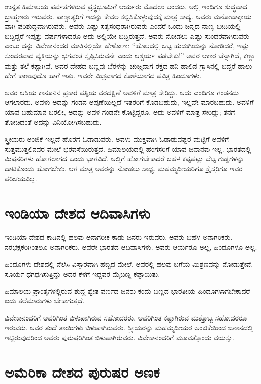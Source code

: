 ಉನ್ನತ ಹಿಮಾಲಯ ಪರ್ವತಗಳಿರುವ ಪ್ರಸ್ಥಭೂಮಿಗೆ ಆರ್ಯರು ಮೊದಲು ಬಂದರು. ಅಲ್ಲಿ ಇಂದಿಗೂ ಶುದ್ಧವಾದ ಬ್ರಾಹ್ಮಣರು ಇರುವರು. ಪಾಶ್ಚಾತ್ಯರಿಗೆ ಇದನ್ನು ಕೇವಲ ಕಲ್ಪಿಸಿಕೊಳ್ಳುವುದಕ್ಕೆ ಮಾತ್ರ ಸಾಧ್ಯ. ಅವರು ಮನೋವಾಕ್ಕಾಯ ವಾಗಿ ಪರಿಶುದ್ಧವಾಗಿರುವರು. ಅವರು ಎಷ್ಟು ಸತ್ಯಸಂಧರಾಗಿರುವರು ಎಂದರೆ ಒಂದು ಚಿನ್ನದ ನಾಣ್ಯ ಬೀದಿಯಲ್ಲಿ ಬಿದ್ದಿದ್ದರೆ ಇಪ್ಪತ್ತು ವರ್ಷಗಳಾದರೂ ಅದು ಅಲ್ಲಿಯೇ ಬಿದ್ದಿರುತ್ತದೆ. ಅವರು ನೋಡಲು ಎಷ್ಟು ಸುಂದರವಾಗಿರುವರು ಎಂಬು ದನ್ನು ವಿವೇಕಾನಂದರ ಮಾತಿನಲ್ಲಿಯೇ ಹೇಳೋಣ: “ಹೊಲದಲ್ಲಿ ಒಬ್ಬ ಹುಡುಗಿಯನ್ನು ನೋಡಿದರೆ, ಇಷ್ಟು ಸುಂದರವಾದ ವ್ಯಕ್ತಿಯನ್ನು ಭಗವಂತ ಸೃಷ್ಟಿಸಿರುವನೇ ಎಂದು ಆಶ್ಚರ್ಯ ಪಡಬೇಕು!” ಅವರ ಆಕಾರ ಚೆನ್ನಾಗಿದೆ, ಕಣ್ಣು ಮತ್ತು ತಲೆ ಕಪ್ಪಾಗಿವೆ. ಅವರ ದೇಹದ ಬಣ್ಣವು ಬೆರಳನ್ನು ಚುಚ್ಚಿದಾಗ ರಕ್ತದ ಹನಿ ಹಾಲಿನ ಗ್ಲಾಸಿನಲ್ಲಿ ಬಿದ್ದರೆ ಹಾಲು ಹೇಗೆ ಕಾಣುವುದೊ ಹಾಗೆ ಇತ್ತು. ಇವರೇ ಮಿಶ್ರವಾಗದ ಕೊಳೆಯಾಗದ ಪವಿತ್ರ ಹಿಂದೂಗಳು.

ಅವರ ಆಸ್ತಿಯ ಕಾನೂನಿನ ಪ್ರಕಾರ ಪತ್ನಿಯ ವರದಕ್ಷಿಣೆ ಅವಳಿಗೆ ಮಾತ್ರ ಸೇರಿದ್ದು. ಅದು ಎಂದಿಗೂ ಗಂಡನದು ಆಗಲಾರದು. ಅವಳು ಅದನ್ನು ಗಂಡನ ಅಪ್ಪಣೆಯಿಲ್ಲದೆ ಇತರರಿಗೆ ಕೊಡಬಹುದು, ಇಲ್ಲವೇ ಮಾರಬಹುದು. ಅವಳಿಗೆ ಯಾವ ಬಹುಮಾನ ಬರಲೀ, ಅದನ್ನು ಅವಳ ಗಂಡನೇ ಕೊಟ್ಟಿದ್ದರೂ, ಅದು ಅವಳಿಗೆ ಮಾತ್ರ ಸೇರಿದ್ದು; ತನಗೆ ತೋಚಿದಂತೆ ಅದನ್ನು ವಿನಿಯೋಗಿಸಬಹುದು.

ಸ್ತ್ರೀಯರು ಅಂಜಿಕೆ ಇಲ್ಲದೆ ಹೊರಗೆ ಓಡಾಡುವರು. ಅವಳು ಮುಕ್ತವಾಗಿ ಓಡಾಡುವಷ್ಟರ ಮಟ್ಟಿಗೆ ಅವಳಿಗೆ ಸುತ್ತಮುತ್ತಲಿನವರ ಮೇಲೆ ಭರವಸೆಯಿರುತ್ತದೆ. ಹಿಮಾಲಯದಲ್ಲಿ ಹೆಂಗಸರಿಗೆ ಯಾವ ಜನಾನವು ಇಲ್ಲ. ಭಾರತದಲ್ಲಿ ಮಿಷನರಿಗಳು ಹೋಗಲಾಗದ ಒಂದು ಭಾಗವಿದೆ. ಅಲ್ಲಿಗೆ ಹೋಗಬೇಕಾದರೆ ಬಹಳ ಕಷ್ಟಪಟ್ಟು ಬೆಟ್ಟ ಗುಡ್ಡಗಳನ್ನು ದಾಟಿಕೊಂಡು ಹೋಗಬೇಕು. ಆಗ ಮಾತ್ರ ಅವರನ್ನು ನೋಡಲು ಸಾಧ್ಯ. ಮಹಮ್ಮದೀಯರಿಗೂ ಕ್ರೈಸ್ತರಿಗೂ ಇವರ ಪರಿಚಯವಿಲ್ಲ.

\delimiter


\section{ಇಂಡಿಯಾ ದೇಶದ ಆದಿವಾಸಿಗಳು}

ಇಂಡಿಯಾ ದೇಶದ ಕಾಡಿನಲ್ಲಿ ಹಲವು ಅನಾಗರೀಕ ಕಾಡು ಜನರು ಇರುವರು. ಅವರು ಬಹಳ ಅನಾಗರಿಕರು. ನರಭಕ್ಷಕರಿಗಿಂತಲೂ ಅನಾಗರಿಕರು. ಅವರೇ ಭಾರತದ ಆದಿವಾಸಿಗಳು. ಅವರು ಆರ್ಯರೂ ಅಲ್ಲ, ಹಿಂದೂಗಳೂ ಅಲ್ಲ.

ಹಿಂದೂಗಳು ದೇಶದಲ್ಲಿ ನೆಲೆಸಿ ವಿಸ್ತಾರವಾಗಿ ಹಬ್ಬಿದ ಮೇಲೆ, ಅವರಲ್ಲಿ ಹಲವು ಬಗೆಯ ಮಿಶ್ರಣವನ್ನು ನೋಡುತ್ತೇವೆ. ಸೂರ್ಯ ಧಗಧಗಿಸುತ್ತಿದ್ದು ಅದರ ಕೆಳಗೆ ಇದ್ದವರ ಮೈಬಣ್ಣ ಕಪ್ಪಾಯಿತು.

ಹಿಮಾಲಯ ಪ್ರಾಂತ್ಯಗಳಲ್ಲಿರುವ ಶುದ್ಧ ಶ್ವೇತ ವರ್ಣದ ಜನರು ಕಂದು ಬಣ್ಣದ ಭಾರತೀಯ ಹಿಂದೂಗಳಾಗಬೇಕಾದರೆ ಐದು ತಲೆಮಾರುಗಳು ಬೇಕಾಗುತ್ತದೆ.

ವಿವೇಕಾನಂದರಿಗೆ ಅವರಿಗಿಂತ ಬಿಳುಪಾಗಿರುವ ಸಹೋದರರು, ಅವರಿಗಿಂತ ಕಪ್ಪಾಗಿರುವ ಮತ್ತೊಬ್ಬ ಸಹೋದರರೂ ಇರುವರು. ಅವರ ತಂದೆ ತಾಯಿಗಳು ಬಿಳುಪಾಗಿರುವರು. ಸ್ತ್ರೀಯರನ್ನು ಮಹಮ್ಮದೀಯರ ಅಂಜಿಕೆಯಿಂದ ಜನಾನದಲ್ಲಿ ಇಟ್ಟಿರುವುದರಿಂದ ಅವರು ಪುರುಷರಿಗಿಂತ ಬಿಳುಪಾಗಿರುವರು. ವಿವೇಕಾನಂದರಿಗೆ ಮೂವತ್ತೊಂದು ವಯಸ್ಸು.

\delimiter


\section{ಅಮೆರಿಕಾ ದೇಶದ ಪುರುಷರ ಅಣಕ}

